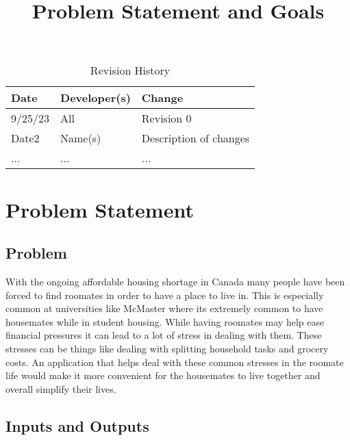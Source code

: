\documentclass{article}
\title{Problem Statement and Goals\\\progname}
\author{\authname}
\date{}
\begin{document}
\maketitle

\begin{table}[hp]
\caption{Revision History} \label{TblRevisionHistory}
\begin{tabularx}{\textwidth}{llX}
\toprule
\textbf{Date} & \textbf{Developer(s)} & \textbf{Change}\\
\midrule
9/25/23 & All & Revision 0\\
Date2 & Name(s) & Description of changes\\
... & ... & ...\\
\bottomrule
\end{tabularx}
\end{table}

\section{Problem Statement}



\subsection{Problem}

With the ongoing affordable housing shortage in Canada many people have been forced to find roomates in order to have a place to live in. This is especially common at universities like McMaster where its extremely common to have housemates while in student housing. While having roomates may help ease financial pressures it can lead to a lot of stress in dealing with them. These stresses can be things like dealing with splitting household tasks and grocery costs. An application that helps deal with these common stresses in the roomate life would make it more convenient  for the housemates to live together and overall simplify their lives.

\subsection{Inputs and Outputs}

\end{document}
